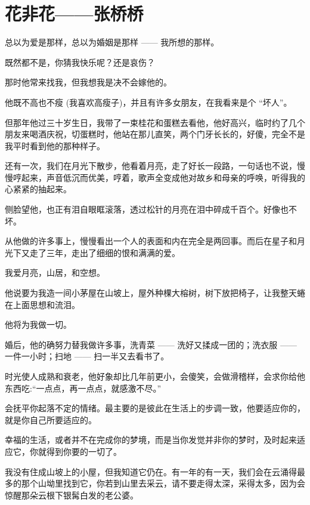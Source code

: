 \section{ 花非花——张桥桥}
总以为爱是那样，总以为婚姻是那样 —— 我所想的那样。

既然都不是，你猜我快乐呢？还是哀伤？


那时他常来找我，但我想我是决不会嫁他的。

他既不高也不瘦 (我喜欢高瘦子)，并且有许多女朋友，在我看来是个 “坏人”。

但那年他过三十岁生日，我带了一束桂花和蛋糕去看他，他好高兴，临时约了几个朋友来喝酒庆祝，切蛋糕时，他站在那儿直笑，两个门牙长长的，好傻，完全不是我平时看到他的那种样子。

还有一次，我们在月光下散步，他看着月亮，走了好长一段路，一句话也不说，慢慢哼起来，声音低沉而优美，哼着，歌声全变成他对故乡和母亲的呼唤，听得我的心紧紧的抽起来。

侧脸望他，也正有泪自眼眶滚落，透过松针的月亮在泪中碎成千百个。好像也不坏。

从他做的许多事上，慢慢看出一个人的表面和内在完全是两回事。而后在星子和月光下又走了三年，走出了细细的恨和满满的爱。


我爱月亮，山居，和空想。

他说要为我造一间小茅屋在山坡上，屋外种棵大榕树，树下放把椅子，让我整天蜷在上面思想和流泪。

他将为我做一切。

婚后，他的确努力替我做许多事，洗青菜 —— 洗好又揉成一团的；洗衣服 —— 一件一小时；扫地 —— 扫一半又去看书了。

时光使人成熟和衰老，他好象却比几年前更小，会傻笑，会做滑稽样，会求你给他东西吃:“一点点，再一点点，就感激不尽。”

会抚平你起落不定的情绪。最主要的是彼此在生活上的步调一致，他要适应你的，就是你自己所要适应的。

幸福的生活，或者并不在完成你的梦境，而是当你发觉并非你的梦时，及时起来适应它，你就得到你要的一切了。

我没有住成山坡上的小屋，但我知道它仍在。有一年的有一天，我们会在云涌得最多的那个山坳里找到它，你若到山里去采云，请不要走得太深，采得太多，因为会惊醒那朵云根下银髯白发的老公婆。
